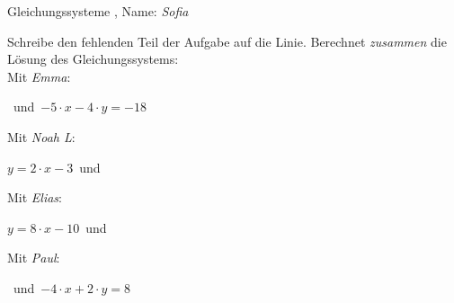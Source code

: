 \newpage
\begin{center}\large Gleichungssysteme
, Name: \emph{Sofia}\end{center}
Schreibe den fehlenden Teil der Aufgabe auf die Linie. Berechnet \emph{zusammen} die Lösung des Gleichungssystems:
\\
\vfill Mit \emph{Emma}:
\begin{center}\underline{}
\mbox{ }und\mbox{ }$-5\cdot x-4\cdot y=-18$\end{center}
\vfill Mit \emph{Noah L}:
\begin{center}$y=2\cdot x-3$\mbox{ }und\mbox{ }\underline{}
\end{center}
\vfill Mit \emph{Elias}:
\begin{center}$y=8\cdot x-10$\mbox{ }und\mbox{ }\underline{}
\end{center}
\vfill Mit \emph{Paul}:
\begin{center}\underline{}
\mbox{ }und\mbox{ }$-4\cdot x+2\cdot y=8$\end{center}
